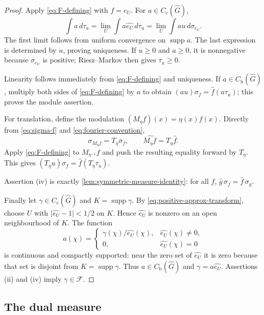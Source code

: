 \documentclass[11pt]{article}
\theoremstyle{definition}
\theoremstyle{remark}
\newcommand{\supp}{\operatorname{supp}}
\newcommand{\Cc}{C_{\mathrm c}}
\newcommand{\Cb}{C_{\mathrm b}}
\newcommand{\dual}[1]{\widehat{#1}}
\newcommand{\abs}[1]{\lvert #1\rvert}
\begin{document}
\begin{proof}
Apply \eqref{eq:F-defining} with $f=e_U$.  For $a\in\Cc(\dual G)$,
\begin{equation}
 \int a\,d\tau_u
 =\lim_U\int a\widehat{e_U}\,d\tau_u
 =\lim_U\int au\,d\sigma_{e_U}.
 \label{eq:tau-recovery}
\end{equation}
The first limit follows from uniform convergence on $\supp a$.  The last expression is
determined by $u$, proving uniqueness.  If $u\geq0$ and $a\geq0$, it is nonnegative
because $\sigma_{e_U}$ is positive; Riesz--Markov then gives $\tau_u\geq0$.

Linearity follows immediately from \eqref{eq:F-defining} and uniqueness.  If
$a\in\Cb(\dual G)$, multiply both sides of \eqref{eq:F-defining} by $a$ to obtain
$(au)\sigma_f=\widehat f(a\tau_u)$; this proves the module assertion.

For translation, define the modulation $(M_\eta f)(x)=\eta(x)f(x)$.  Directly from
\eqref{eq:sigma-f} and \eqref{eq:fourier-convention},
\begin{equation}
 \sigma_{M_\eta f}=T_\eta\sigma_f,
 \qquad \widehat{M_\eta f}=T_\eta\widehat f.
 \label{eq:modulation-translation}
\end{equation}
Apply \eqref{eq:F-defining} to $M_{\eta^{-1}}f$ and push the resulting equality forward
by $T_\eta$.  This gives
$(T_\eta u)\sigma_f=\widehat f(T_\eta\tau_u)$.

Assertion (iv) is exactly \cref{lem:symmetric-measure-identity}: for all $f$,
$\widehat g\,\sigma_f=\widehat f\,\sigma_g$.

Finally let $\gamma\in\Cc(\dual G)$ and $K=\supp\gamma$.  By
\eqref{eq:positive-approx-transform}, choose $U$ with
$\abs{\widehat{e_U}-1}<1/2$ on $K$.  Hence $\widehat{e_U}$ is nonzero on an open
neighbourhood of $K$.  The function
\[
 a(\chi)=
 \begin{cases}
   \gamma(\chi)/\widehat{e_U}(\chi),&\widehat{e_U}(\chi)\neq0,\\
   0,&\widehat{e_U}(\chi)=0
 \end{cases}
\]
is continuous and compactly supported: near the zero set of $\widehat{e_U}$ it is zero
because that set is disjoint from $K=\supp\gamma$.  Thus $a\in\Cb(\dual G)$ and
$\gamma=a\widehat{e_U}$.  Assertions (ii) and (iv) imply $\gamma\in\mathcal F$.
\end{proof}

\subsection{The dual measure}
\end{document}

